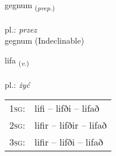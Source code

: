 \documentclass[frontgrid, backgrid]{flacards}\usepackage[]{graphicx}\usepackage[]{xcolor}
\begin{document}
\renewcommand{\blhead}{\vskip5pt {\small\bfseries\footnotesize Forsetning | Preposition }}
\renewcommand{\bcfoot}{\vskip5pt \hspace{2pt}{\small\bfseries\footnotesize 1K}}


{gegnum \small{\textsubscript{(\textit{prep.})}} \\[1ex]
\textphonetic{[cɛknʏm]} \\
pl.: \emph{przez} \\  [2ex]
gegnum (Indeclinable)}

\renewcommand{\flhead}{\vskip5pt \fboxsep=0pt {\small\bfseries\footnotesize Sagnorð | Verb}}
\renewcommand{\fcfoot}{\vskip5pt \fboxsep=0pt \hspace{2pt}{\small\bfseries\footnotesize 1K}}

\renewcommand{\blhead}{\vskip5pt {\small\bfseries\footnotesize Sagnorð | Verb }}
\renewcommand{\bcfoot}{\vskip5pt \hspace{2pt}{\small\bfseries\footnotesize 1K}}


{lifa \small{\textsubscript{(\textit{v.})}} \\[1ex] %
\textphonetic{[lɪːva]} \\
pl.: \emph{żyć} \\  [2ex]
\renewcommand*{\arraystretch}{0.8}
\begin{tabular}{p{1cm}l}
\textsc{1sg}: & lifi -- lifði -- lifað \\ 
\textsc{2sg}: & lifir -- lifðir -- lifað \\ 
\textsc{3sg}: & lifir -- lifði -- lifað \\ 
\end{tabular}
}

\renewcommand{\flhead}{\vskip5pt \fboxsep=0pt {\small\bfseries\footnotesize Atviksorð | Adverb}}
\renewcommand{\fcfoot}{\vskip5pt \fboxsep=0pt \hspace{2pt}{\small\bfseries\footnotesize 1K}}

\renewcommand{\blhead}{\vskip5pt {\small\bfseries\footnotesize Atviksorð | Adverb }}
\renewcommand{\bcfoot}{\vskip5pt \hspace{2pt}{\small\bfseries\footnotesize 1K}}
\end{document}
